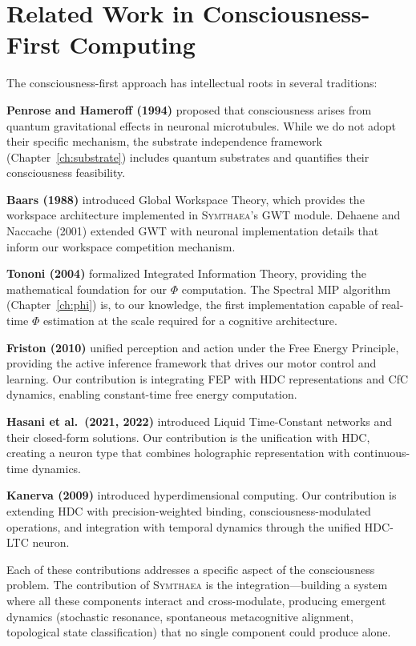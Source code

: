 \documentclass[12pt]{book}
\newcommand{\symthaea}{\textsc{Symthaea}}
\begin{document}
\section{Related Work in Consciousness-First Computing}

The consciousness-first approach has intellectual roots in several traditions:

\textbf{Penrose and Hameroff (1994)} proposed that consciousness arises from quantum gravitational effects in neuronal microtubules. While we do not adopt their specific mechanism, the substrate independence framework (Chapter~\ref{ch:substrate}) includes quantum substrates and quantifies their consciousness feasibility.

\textbf{Baars (1988)} introduced Global Workspace Theory, which provides the workspace architecture implemented in \symthaea{}'s GWT module. Dehaene and Naccache (2001) extended GWT with neuronal implementation details that inform our workspace competition mechanism.

\textbf{Tononi (2004)} formalized Integrated Information Theory, providing the mathematical foundation for our $\Phi$ computation. The Spectral MIP algorithm (Chapter~\ref{ch:phi}) is, to our knowledge, the first implementation capable of real-time $\Phi$ estimation at the scale required for a cognitive architecture.

\textbf{Friston (2010)} unified perception and action under the Free Energy Principle, providing the active inference framework that drives our motor control and learning. Our contribution is integrating FEP with HDC representations and CfC dynamics, enabling constant-time free energy computation.

\textbf{Hasani et al.\ (2021, 2022)} introduced Liquid Time-Constant networks and their closed-form solutions. Our contribution is the unification with HDC, creating a neuron type that combines holographic representation with continuous-time dynamics.

\textbf{Kanerva (2009)} introduced hyperdimensional computing. Our contribution is extending HDC with precision-weighted binding, consciousness-modulated operations, and integration with temporal dynamics through the unified HDC-LTC neuron.

Each of these contributions addresses a specific aspect of the consciousness problem. The contribution of \symthaea{} is the integration---building a system where all these components interact and cross-modulate, producing emergent dynamics (stochastic resonance, spontaneous metacognitive alignment, topological state classification) that no single component could produce alone.
\end{document}
